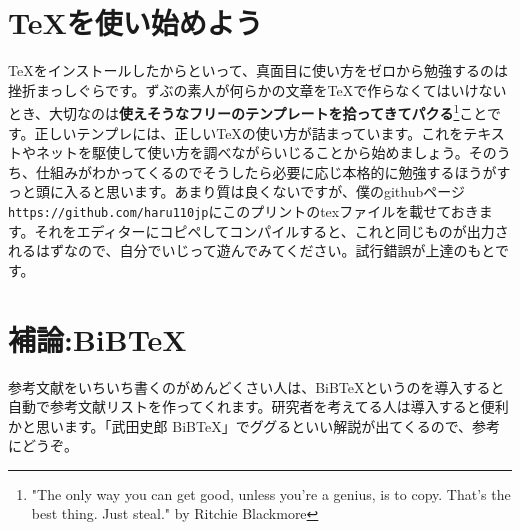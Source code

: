 \documentclass[a4paper]{jarticle}
\begin{document}
\section{\TeX を使い始めよう}
\TeX をインストールしたからといって、真面目に使い方をゼロから勉強するのは挫折まっしぐらです。ずぶの素人が何らかの文章を\TeX で作らなくてはいけないとき、大切なのは{\bf 使えそうなフリーのテンプレートを拾ってきてパクる}\footnote{"The only way you can get good, unless you're a genius, is to copy. That's the best thing. Just steal." by Ritchie Blackmore}ことです。正しいテンプレには、正しい\TeX の使い方が詰まっています。これをテキストやネットを駆使して使い方を調べながらいじることから始めましょう。そのうち、仕組みがわかってくるのでそうしたら必要に応じ本格的に勉強するほうがすっと頭に入ると思います。あまり質は良くないですが、僕のgithubページ\verb|https://github.com/haru110jp|にこのプリントのtexファイルを載せておきます。それをエディターにコピペしてコンパイルすると、これと同じものが出力されるはずなので、自分でいじって遊んでみてください。試行錯誤が上達のもとです。

\section{補論:BiBTeX}
参考文献をいちいち書くのがめんどくさい人は、BiBTeXというのを導入すると自動で参考文献リストを作ってくれます。研究者を考えてる人は導入すると便利かと思います。「武田史郎 BiBTeX」でググるといい解説が出てくるので、参考にどうぞ。
\end{document}
